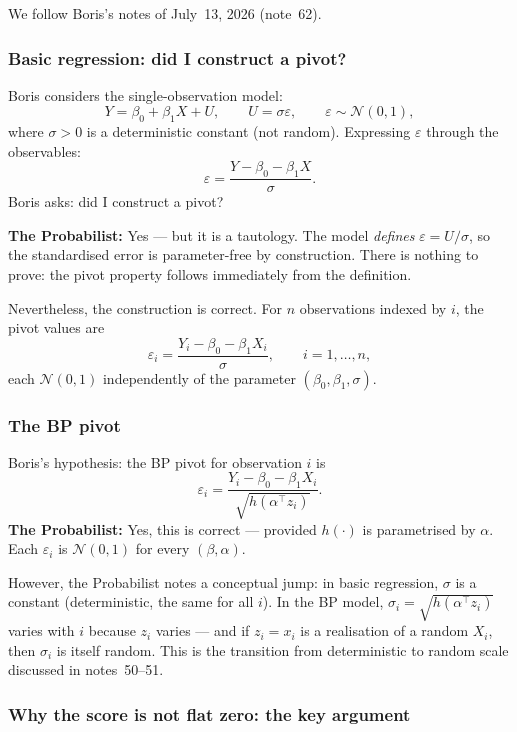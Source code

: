 \documentclass[a4paper,oneside,12pt]{extarticle}
\theoremstyle{plain}
\theoremstyle{definition}
\theoremstyle{remark}
\begin{document}
We follow Boris's notes of July~13, 2026 (note~62).

\subsubsection*{Basic regression: did I construct a pivot?}

Boris considers the single-observation model:
\[
  Y = \beta_0 + \beta_1 X + U, \qquad U = \sigma\varepsilon,
  \qquad \varepsilon \sim \mathcal{N}(0,1),
\]
where $\sigma > 0$ is a deterministic constant (not random).
Expressing $\varepsilon$ through the observables:
\[
  \varepsilon = \frac{Y - \beta_0 - \beta_1 X}{\sigma}.
\]
Boris asks: did I construct a pivot?

\textbf{The Probabilist:} Yes --- but it is a tautology.  The model
\emph{defines} $\varepsilon = U/\sigma$, so the standardised error
is parameter-free by construction.  There is nothing to prove: the
pivot property follows immediately from the definition.

Nevertheless, the construction is correct.  For $n$ observations
indexed by $i$, the pivot values are
\[
  \varepsilon_i = \frac{Y_i - \beta_0 - \beta_1 X_i}{\sigma},
  \qquad i = 1,\ldots,n,
\]
each $\mathcal{N}(0,1)$ independently of the parameter
$(\beta_0, \beta_1, \sigma)$.

\subsubsection*{The BP pivot}

Boris's hypothesis: the BP pivot for observation $i$ is
\[
  \varepsilon_i = \frac{Y_i - \beta_0 - \beta_1 X_i}
                        {\sqrt{h(\alpha^\top z_i)}}.
\]
\textbf{The Probabilist:} Yes, this is correct --- provided $h(\cdot)$ is
parametrised by $\alpha$.  Each $\varepsilon_i$ is
$\mathcal{N}(0,1)$ for every $(\beta,\alpha)$.

However, the Probabilist notes a conceptual jump: in basic regression,
$\sigma$ is a constant (deterministic, the same for all $i$).
In the BP model, $\sigma_i = \sqrt{h(\alpha^\top z_i)}$ varies
with $i$ because $z_i$ varies --- and if $z_i = x_i$ is a
realisation of a random $X_i$, then $\sigma_i$ is itself random.
This is the transition from deterministic to random scale discussed
in notes~50--51.

\subsubsection*{Why the score is not flat zero: the key argument}
\end{document}
